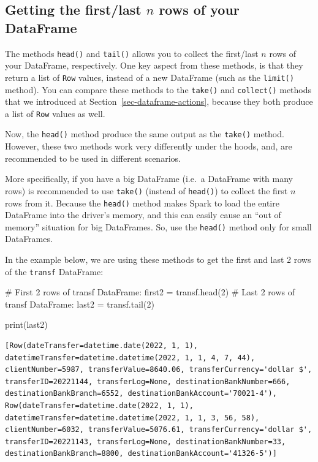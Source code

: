 \documentclass[
  11pt,
  letterpaper,
  DIV=11,
  numbers=noendperiod]{scrreprt}
\newenvironment{Shaded}{\begin{snugshade}}{\end{snugshade}}
\newcommand{\BuiltInTok}[1]{\textcolor[rgb]{0.00,0.23,0.31}{#1}}
\newcommand{\CommentTok}[1]{\textcolor[rgb]{0.37,0.37,0.37}{#1}}
\newcommand{\DecValTok}[1]{\textcolor[rgb]{0.68,0.00,0.00}{#1}}
\newcommand{\NormalTok}[1]{\textcolor[rgb]{0.00,0.23,0.31}{#1}}
\newcommand{\OperatorTok}[1]{\textcolor[rgb]{0.37,0.37,0.37}{#1}}
\begin{document}
\hypertarget{getting-the-firstlast-n-rows-of-your-dataframe}{%
\subsection{\texorpdfstring{Getting the first/last \(n\) rows of your
DataFrame}{Getting the first/last n rows of your DataFrame}}\label{getting-the-firstlast-n-rows-of-your-dataframe}}

The methods \texttt{head()} and \texttt{tail()} allows you to collect
the first/last \(n\) rows of your DataFrame, respectively. One key
aspect from these methods, is that they return a list of \texttt{Row}
values, instead of a new DataFrame (such as the \texttt{limit()}
method). You can compare these methods to the \texttt{take()} and
\texttt{collect()} methods that we introduced at
Section~\ref{sec-dataframe-actions}, because they both produce a list of
\texttt{Row} values as well.

Now, the \texttt{head()} method produce the same output as the
\texttt{take()} method. However, these two methods work very differently
under the hoods, and, are recommended to be used in different scenarios.

More specifically, if you have a big DataFrame (i.e.~a DataFrame with
many rows) is recommended to use \texttt{take()} (instead of
\texttt{head()}) to collect the first \(n\) rows from it. Because the
\texttt{head()} method makes Spark to load the entire DataFrame into the
driver's memory, and this can easily cause an ``out of memory''
situation for big DataFrames. So, use the \texttt{head()} method only
for small DataFrames.

In the example below, we are using these methods to get the first and
last 2 rows of the \texttt{transf} DataFrame:

\begin{Shaded}
\begin{Highlighting}[]
\CommentTok{\# First 2 rows of \textasciigrave{}transf\textasciigrave{} DataFrame:}
\NormalTok{first2 }\OperatorTok{=}\NormalTok{ transf.head(}\DecValTok{2}\NormalTok{)}
\CommentTok{\# Last 2 rows of \textasciigrave{}transf\textasciigrave{} DataFrame:}
\NormalTok{last2 }\OperatorTok{=}\NormalTok{ transf.tail(}\DecValTok{2}\NormalTok{)}

\BuiltInTok{print}\NormalTok{(last2)}
\end{Highlighting}
\end{Shaded}

\begin{verbatim}
[Row(dateTransfer=datetime.date(2022, 1, 1), datetimeTransfer=datetime.datetime(2022, 1, 1, 4, 7, 44), clientNumber=5987, transferValue=8640.06, transferCurrency='dollar $', transferID=20221144, transferLog=None, destinationBankNumber=666, destinationBankBranch=6552, destinationBankAccount='70021-4'), Row(dateTransfer=datetime.date(2022, 1, 1), datetimeTransfer=datetime.datetime(2022, 1, 1, 3, 56, 58), clientNumber=6032, transferValue=5076.61, transferCurrency='dollar $', transferID=20221143, transferLog=None, destinationBankNumber=33, destinationBankBranch=8800, destinationBankAccount='41326-5')]
\end{verbatim}
\end{document}
